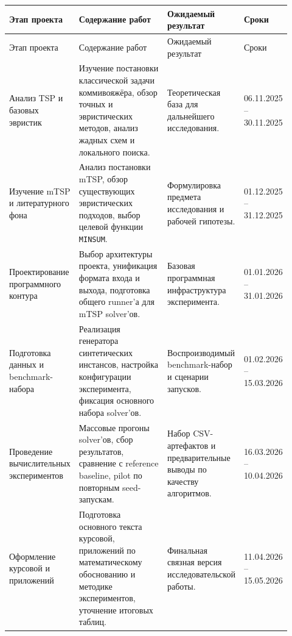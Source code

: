 \documentclass[a4paper,12pt]{article}
\begin{document}
\begin{longtable}{L{0.2\linewidth}L{0.35\linewidth}L{0.22\linewidth}L{0.15\linewidth}}
\toprule
Этап проекта & Содержание работ & Ожидаемый результат & Сроки \\
\midrule
\endfirsthead
\toprule
Этап проекта & Содержание работ & Ожидаемый результат & Сроки \\
\midrule
\endhead
Анализ TSP и базовых эвристик & Изучение постановки классической задачи коммивояжёра, обзор точных и эвристических методов, анализ жадных схем и локального поиска. & Теоретическая база для дальнейшего исследования. & 06.11.2025 -- 30.11.2025 \\
Изучение mTSP и литературного фона & Анализ постановки mTSP, обзор существующих эвристических подходов, выбор целевой функции \texttt{MINSUM}. & Формулировка предмета исследования и рабочей гипотезы. & 01.12.2025 -- 31.12.2025 \\
Проектирование программного контура & Выбор архитектуры проекта, унификация формата входа и выхода, подготовка общего runner'а для mTSP solver'ов. & Базовая программная инфраструктура эксперимента. & 01.01.2026 -- 31.01.2026 \\
Подготовка данных и benchmark-набора & Реализация генератора синтетических инстансов, настройка конфигурации эксперимента, фиксация основного набора solver'ов. & Воспроизводимый benchmark-набор и сценарии запусков. & 01.02.2026 -- 15.03.2026 \\
Проведение вычислительных экспериментов & Массовые прогоны solver'ов, сбор результатов, сравнение с reference baseline, pilot по повторным seed-запускам. & Набор CSV-артефактов и предварительные выводы по качеству алгоритмов. & 16.03.2026 -- 10.04.2026 \\
Оформление курсовой и приложений & Подготовка основного текста курсовой, приложений по математическому обоснованию и методике экспериментов, уточнение итоговых таблиц. & Финальная связная версия исследовательской работы. & 11.04.2026 -- 15.05.2026 \\
\bottomrule
\end{longtable}

\printbibliography[title={Список литературы}]
\end{document}

